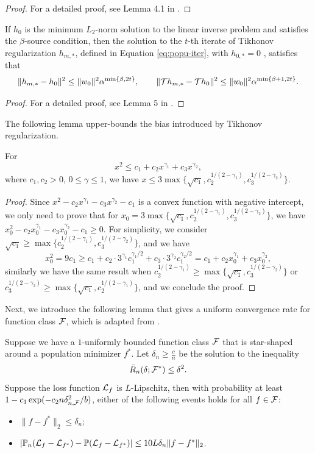 \begin{proof}
    For a detailed proof, see Lemma 4.1 in \cite{van1993hellinger}.
\end{proof}
\begin{lemma}\label{lem:iter-tikh-bias}
    If $h_0$ is the minimum $L_2$-norm solution to the linear inverse problem and satisfies the $\beta$-source condition, then the solution to the $t$-th iterate of Tikhonov
regularization $h_{m,*}$, defined in Equation \eqref{eq:popu-iter}, with $h_{0,*}= 0$ , satisfies that
$$
\|h_{m,*} - h_0\|^2 \leq \|w_0\|^2 \alpha^{\min\{\beta, 2t\}}, \qquad\|{\mathcal{T}} h_{m,*} - {\mathcal{T}} h_0\|^2 \leq \|w_0\|^2 \alpha^{\min\{\beta+1, 2t\}}.
$$
\end{lemma}
\begin{proof}
    For a detailed proof, see Lemma 5 in \cite{bennett2023source}.
\end{proof}
The following lemma upper-bounds the bias introduced by Tikhonov regularization.
\begin{lemma}\label{lem:aux-1}
    For $$
    x^2 \leq c_1 + c_2 x^{\gamma_1} + c_3 x^{\gamma_2},
    $$
    where $c_1, c_2>0$, $0\leq\gamma\leq 1$, we have $x \leq 3 \max\big\{\sqrt{c_1}, c_2^{1/(2-\gamma_1)},c_3^{1/(2-\gamma_2)}\big\}$. 
\end{lemma}
\begin{proof}
   Since $x^2 - c_2 x^{\gamma_1} -c_3 x^{\gamma_2} -c_1$ is a convex function with negative intercept, we only need to prove that for $x_0 = 3 \max\big\{\sqrt{c_1}, c_2^{1/(2-\gamma_1)},c_3^{1/(2-\gamma_2)}\big\}$, we have $x_0^2 - c_2 x_0^{\gamma_1} -c_3 x_0^{\gamma_2} -c_1 \geq 0$. For simplicity, we consider $\sqrt{c_1} \geq \max\{ c_2^{1/(2-\gamma_1)},c_3^{1/(2-\gamma_2)}\}$, and  we have $$
   x_0^2 = 9c_1\geq c_1 + c_2\cdot3^{\gamma_1}  c_1^{\gamma_1/2}+c_3\cdot3^{\gamma_2}  c_1^{\gamma_2/2} = c_1+ c_2 x_0^{\gamma_1} + c_3 x_0^{\gamma_2},
   $$
   similarly we have the same result when $ c_2^{1/(2-\gamma_1)}\geq \max\{ \sqrt{c_1},c_3^{1/(2-\gamma_2)}\}$ or $c_3^{1/(2-\gamma_2)}\geq \max\{ \sqrt{c_1},c_2^{1/(2-\gamma_1)}\}$,
   and we conclude the proof.
\end{proof}
Next, we introduce the following lemma that gives a uniform convergence rate for function class $\mathcal{F}$, which is adapted from \citet{wainwright2019high}.
\begin{lemma}\label{lem:2cond}
    Suppose we have a $1$-uniformly bounded function class $\mathcal{F}$ that is star-shaped around a population minimizer $f^*$. Let $\delta_n\geq \frac{c}{n}$ be the solution to the inequality $$
    \bar{R}_n(\delta;\mathcal{F}^*)\leq\delta^2.
    $$
    Suppose the loss function $\mathcal{L}_f$ is $L$-Lipschitz, then with probability at least $1 - c_1 \exp(-c_2 n\delta_{n,\mathcal{F}}^2/b)$, either of the following events holds for all $f\in\mathcal{F}$: \begin{itemize}
        \item[(1)] $\|f - f^*\|_2\leq \delta_n$;
        \item[(2)] $|\mathbb{P}_n (\mathcal{L}_f - \mathcal{L}_{f^*} ) -\mathbb{P} (\mathcal{L}_f - \mathcal{L}_{f^*} ) | \leq 10L\delta_n\| f - f^*\|_2$.
    \end{itemize}
\end{lemma}
